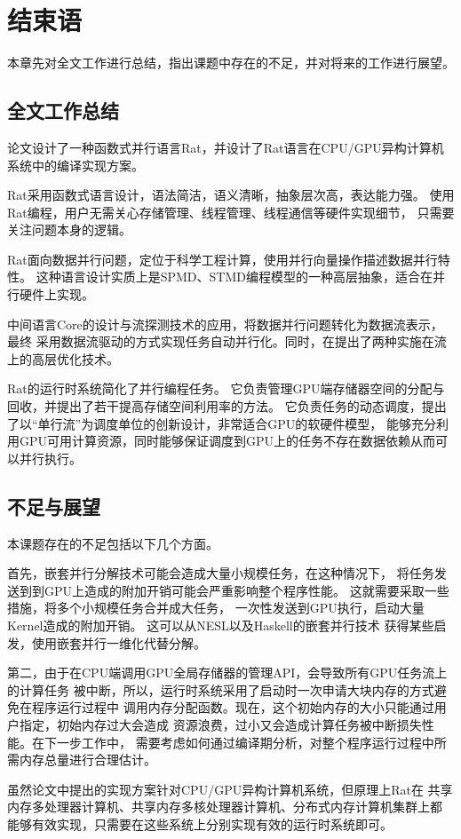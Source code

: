 \chapter{结束语}
本章先对全文工作进行总结，指出课题中存在的不足，并对将来的工作进行展望。

\section{全文工作总结}
论文设计了一种函数式并行语言Rat，并设计了Rat语言在CPU/GPU异构计算机系统中的编译实现方案。

Rat采用函数式语言设计，语法简洁，语义清晰，抽象层次高，表达能力强。
使用Rat编程，用户无需关心存储管理、线程管理、线程通信等硬件实现细节，
只需要关注问题本身的逻辑。

Rat面向数据并行问题，定位于科学工程计算，使用并行向量操作描述数据并行特性。
这种语言设计实质上是SPMD、STMD编程模型的一种高层抽象，适合在并行硬件上实现。

中间语言Core的设计与流探测技术的应用，将数据并行问题转化为数据流表示，最终
采用数据流驱动的方式实现任务自动并行化。同时，在提出了两种实施在流上的高层优化技术。

Rat的运行时系统简化了并行编程任务。
它负责管理GPU端存储器空间的分配与回收，并提出了若干提高存储空间利用率的方法。
它负责任务的动态调度，提出了以“单行流”为调度单位的创新设计，非常适合GPU的软硬件模型，
能够充分利用GPU可用计算资源，同时能够保证调度到GPU上的任务不存在数据依赖从而可以并行执行。

\section{不足与展望}
本课题存在的不足包括以下几个方面。

首先，嵌套并行分解技术可能会造成大量小规模任务，在这种情况下，
将任务发送到到GPU上造成的附加开销可能会严重影响整个程序性能。
这就需要采取一些措施，将多个小规模任务合并成大任务，
一次性发送到GPU执行，启动大量Kernel造成的附加开销。
这可以从NESL以及Haskell的嵌套并行技术
获得某些启发，使用嵌套并行一维化代替分解。

第二，由于在CPU端调用GPU全局存储器的管理API，会导致所有GPU任务流上的计算任务
被中断，所以，运行时系统采用了启动时一次申请大块内存的方式避免在程序运行过程中
调用内存分配函数。现在，这个初始内存的大小只能通过用户指定，初始内存过大会造成
资源浪费，过小又会造成计算任务被中断损失性能。在下一步工作中，
需要考虑如何通过编译期分析，对整个程序运行过程中所需内存总量进行合理估计。

虽然论文中提出的实现方案针对CPU/GPU异构计算机系统，但原理上Rat在
共享内存多处理器计算机、共享内存多核处理器计算机、分布式内存计算机集群上都
能够有效实现，只需要在这些系统上分别实现有效的运行时系统即可。

